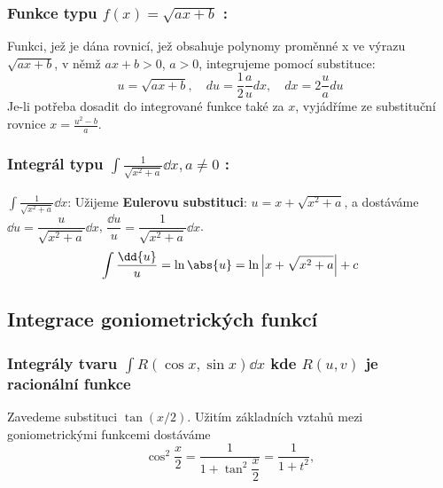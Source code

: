     \subsubsection*{Funkce typu $\boxed{f(x)=\sqrt{ax+b}}$ :}
      Funkci, jež je dána rovnicí, jež obsahuje polynomy proměnné x  ve výrazu $\sqrt{ax+b}$,
      v němž $ax+b>0$, $a>0$, integrujeme pomocí substituce:
      \begin{equation}\label{ma:eq_sub_fce1}
          u=\sqrt{ax+b},\quad du=\frac{1}{2}\frac{a}{u}dx,\quad dx=2\frac{u}{a}du
      \end{equation}
      Je-li potřeba dosadit do integrované funkce také za $x$, vyjádříme ze substituční
      rovnice $x=\frac{u^2-b}{a}$.
    \subsubsection*{Integrál typu $\boxed{\int\frac{1}{\sqrt{x^2+a}}\dd{x}}, a\neq0$ :}
      \(\int\frac{1}{\sqrt{x^2+a}}\dd{x}\):\vskip0.5mm
      Užijeme \textbf{Eulerovu substituci}: \(u=x+\sqrt{x^2+a}\), a dostáváme
      \(\dd{u}=\dfrac{u}{\sqrt{x^2+a}}\dd{x}\), \(\dfrac{\dd{u}}{u}=\dfrac{1}{\sqrt{x^2+a}}\dd{x}\).
      \begin{equation}
        \int{\frac{\dd{u}}{u}}=\ln\abs{u} =\ln\left\lvert x+\sqrt{x^2+a}\right\rvert+c
      \end{equation}
  \newpage
  \subsection{Integrace goniometrických funkcí}
    \subsubsection{Integrály tvaru \(\int R(\cos x, \sin x)\dd{x}\) kde \(R(u, v)\) je racionální
    funkce}
      Zavedeme substituci \(\tan(x/2)\). Užitím základních vztahů mezi goniometrickými funkcemi
      dostáváme 
      \begin{equation}\label{mai:eq164}
        \cos^2\dfrac{x}{2} = \dfrac{1}{1+ \tan^2\dfrac{x}{2}} = \dfrac{1}{1+t^2},
      \end{equation}
